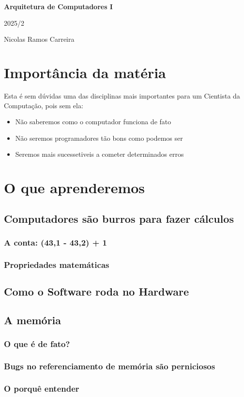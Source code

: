 \documentclass[12pt,a4paper]{report}
\begin{document}
	
	\begin{titlepage}
		\centering
		\vspace*{5cm} %
		
		{\Huge\bfseries Arquitetura de Computadores I\par} %
		
		\vspace{0.5cm}
		{\Large 2025/2\par} %
		
		\vfill
		{\large Nicolas Ramos Carreira\par} %
		
		\vspace*{2cm}
	\end{titlepage}
	
	\tableofcontents
	\newpage
	
	\chapter{Importância da matéria}
	Esta é sem dúvidas uma das disciplinas mais importantes para um Cientista da Computação, pois sem ela:
	
	\begin{itemize}
		\item Não saberemos como o computador funciona de fato
		\item Não seremos programadores tão bons como podemos ser
		\item Seremos mais sucessetiveis a cometer determinados erros
		
	\end{itemize}
	
	\chapter{O que aprenderemos}
	\section{Computadores são burros para fazer cálculos}
	\subsection{A conta: (43,1 - 43,2) + 1}
	\subsection{Propriedades matemáticas}
	\section{Como o Software roda no Hardware}
	
	\section{A memória}
	\subsection{O que é de fato?}
	\subsection{Bugs no referenciamento de memória são perniciosos}
	\subsection{O porquê entender}
	
\end{document}
